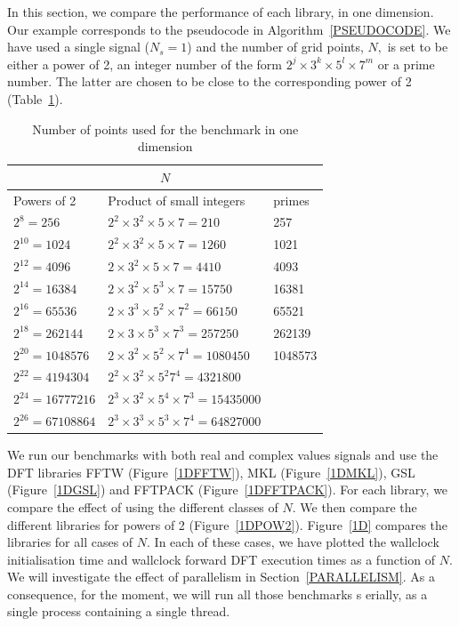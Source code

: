\documentclass[12pt, a4paper]{article} \setlength{\textheight}{24cm}
\begin{document}
In this section, we compare the performance of each library, in one
dimension.  Our example corresponds to the pseudocode in
Algorithm~\ref{PSEUDOCODE}. We have used a single signal ($N_s=1$) and
the number of grid points, $N,$ is set to be either a power of 2, an
integer number of the form $2^j\times  3^k\times  5^l\times 7^m$ or a prime number. The
latter are chosen to be close to the corresponding power of 2
(Table~\ref{SIZES1D}).
\begin{table}[H]
  \centering
  \begin{tabular}{|l|l|l|}
    \hline
    \multicolumn{3}{|c|}{$N$}\\
    \hline
    \hline
    Powers of 2 & Product of small integers & primes\\ \hline
    $2^8=256$	 & $2^2\times 3^2\times 5\times 7=210$	     & 257  \\ \hline
    $2^{10}=1024$	 & $2^2\times 3^2\times 5\times 7=1260$	     & 1021  \\ \hline
    $2^{12}=4096$	 & $2\times 3^2\times 5\times 7=4410$	     & 4093 \\ \hline
    $2^{14}=16384$	 & $2\times 3^2\times 5^3\times 7=15750$	     & 16381 \\ \hline
    $2^{16}=65536$	 & $2\times 3^3\times 5^2\times 7^2=66150$      & 65521 \\ \hline
    $2^{18}=262144$	 & $2\times 3\times 5^3\times 7^3=257250$       & 262139 \\ \hline
    $2^{20}=1048576$  & $2\times 3^2\times 5^2\times 7^4=1080450$    & 1048573 \\ \hline
    $2^{22}=4194304$  & $2^2\times 3^2\times 5^2 7^4=4321800$  &	\\ \hline
    $2^{24}=16777216$ & $2^3\times 3^2\times 5^4\times 7^3=15435000$ &	\\ \hline
    $2^{26}=67108864$ & $2^3\times 3^3\times 5^3\times 7^4=64827000$ &\\ \hline
  \end{tabular}
  \caption{Number of points used for the benchmark in one dimension}\label{SIZES1D}
\end{table}


We run our benchmarks with both real and complex values signals and
use the DFT libraries FFTW (Figure~\ref{1DFFTW}), MKL
(Figure~\ref{1DMKL}), GSL (Figure~\ref{1DGSL}) and FFTPACK
(Figure~\ref{1DFFTPACK}). For each library, we compare the effect of
using the different classes of $N.$ We then compare the different
libraries for powers of 2 (Figure~\ref{1DPOW2}). Figure~\ref{1D} compares the libraries for all cases of $N.$ In each of these cases, we have plotted the
wallclock initialisation time and wallclock forward DFT execution
times as a function of $N.$ We will investigate the effect of
parallelism in Section~\ref{PARALLELISM}. As a consequence, for the
moment, we will run all those benchmarks s erially, as a single
process containing a single thread.
\end{document}
